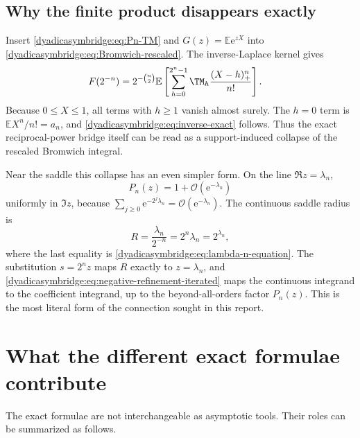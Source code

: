 \documentclass[11pt,oneside]{article}
\theoremstyle{definition}
\theoremstyle{remark}
\newcommand{\e}{\mathrm e}
\newcommand{\E}{\mathbb E}
\newcommand{\bigO}{\mathcal O}
\begin{document}
\subsection{Why the finite product disappears exactly}

Insert \eqref{dyadicasymbridge:eq:Pn-TM} and $G(z)=\E\e^{zX}$ into
\eqref{dyadicasymbridge:eq:Bromwich-rescaled}.  The inverse-Laplace kernel gives
\begin{align}
 F(2^{-n})
 &=2^{-\binom n2}
 \E\left[
 \sum_{h=0}^{2^n-1}\TM_h\frac{(X-h)_+^n}{n!}
 \right].
\label{dyadicasymbridge:eq:positive-part-collapse}
\end{align}
Because $0\le X\le1$, all terms with $h\ge1$ vanish almost surely.  The $h=0$ term is
$\E X^n/n!=a_n$, and \eqref{dyadicasymbridge:eq:inverse-exact} follows.  Thus the exact reciprocal-power bridge itself can be read as a support-induced collapse of the rescaled Bromwich integral.

Near the saddle this collapse has an even simpler form.  On the line $\Re z=\lambda_n$,
\begin{equation}
 P_n(z)=1+\bigO(\e^{-\lambda_n})
\label{dyadicasymbridge:eq:Pn-near-one}
\end{equation}
uniformly in $\Im z$, because
$\sum_{j\ge0}\e^{-2^j\lambda_n}=\bigO(\e^{-\lambda_n})$.
The continuous saddle radius is
\begin{equation}
 R=\frac{\lambda_n}{2^{-n}}=2^n\lambda_n=2^{\lambda_n},
\label{dyadicasymbridge:eq:continuous-vs-coeff-saddle}
\end{equation}
where the last equality is \eqref{dyadicasymbridge:eq:lambda-n-equation}.  The substitution
$s=2^nz$ maps $R$ exactly to $z=\lambda_n$, and
\eqref{dyadicasymbridge:eq:negative-refinement-iterated} maps the continuous integrand to the coefficient integrand, up to the beyond-all-orders factor $P_n(z)$.  This is the most literal form of the connection sought in this report.

\section{What the different exact formulae contribute}
\label{dyadicasymbridge:sec:formula-audit}

The exact formulae are not interchangeable as asymptotic tools.  Their roles can be summarized as follows.
\end{document}
